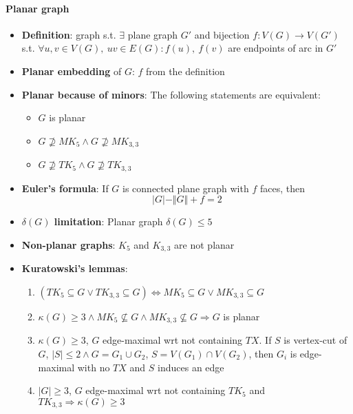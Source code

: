 \paragraph{Planar graph}
\begin{itemize}
  \item \textbf{Definition}: graph s.t. $ \exists $ plane graph $ G' $ and bijection $ f: V(G) \to V(G') $ s.t. $ \forall u,v \in V(G), \ uv \in E(G) : f(u), \ f(v) $ are endpoints of arc in $ G' $
  \item \textbf{Planar embedding} of $ G $: $ f $ from the definition
  \item \textbf{Planar because of minors}: The following statements are equivalent:
  \begin{itemize}
    \item $ G $ is planar 
    \item $ G \not \supseteq MK_5 \wedge G \not \supseteq MK_{3,3} $
    \item $ G \not \supseteq TK_5 \wedge G \not \supseteq TK_{3,3} $
  \end{itemize}
  \item \textbf{Euler's formula}: If $ G $ is connected plane graph with $ f $ faces, then
    \begin{equation*}
      \vert G \vert - \Vert G \Vert + f = 2
    \end{equation*}
  \item \textbf{$ \delta(G) $ limitation}: Planar graph $ \delta(G) \leq 5 $
  \item \textbf{Non-planar graphs}: $ K_5 $ and $ K_{3,3} $ are not planar
  \item \textbf{Kuratowski's lemmas}:
  \begin{enumerate}
    \item $ (TK_5 \subseteq G \vee TK_{3,3} \subseteq G) \Leftrightarrow MK_5 \subseteq G \vee MK_{3,3} \subseteq G $ 
    \item $ \kappa(G) \geq 3 \wedge MK_5 \not \subseteq G \wedge MK_{3,3} \not \subseteq G \Rightarrow G $ is planar
    \item $ \kappa(G) \geq 3 $, $ G $ edge-maximal wrt not containing $ TX $. If $ S $ is vertex-cut of $ G $, $ \vert S \vert \leq 2 \wedge G = G_1 \cup G_2 $, $ S = V(G_1) \cap V(G_2) $, then $ G_i $ is edge-maximal with no $ TX $ and $ S $ induces an edge
    \item $ \vert G \vert \geq 3 $, $ G $ edge-maximal wrt not containing $ TK_5 $ and $ TK_{3,3} \Rightarrow \kappa(G) \geq 3 $
  \end{enumerate}
\end{itemize}


